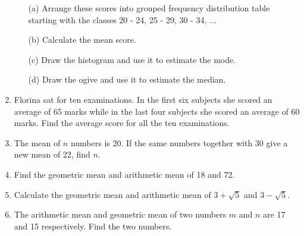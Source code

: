 \begin{enumerate}
	\begin{itemize}
	\item[(a)] Arrange these scores into grouped frequency distribution table starting with the classes 20 - 24, 25 - 29, 30 - 34, $\ldots$
	\item[(b)] Calculate the mean score.
	\item[(c)] Draw the histogram and use it to estimate the mode.
	\item[(d)] Draw the ogive and use it to estimate the median.
	\end{itemize}
	
	\item Florina sat for ten examinations. In the first six subjects she scored an average of 65 marks while in the last four subjects she scored an average of 60 marks. Find the average score for all the ten examinations.
	
	\item The mean of $n$ numbers is 20. If the same numbers together with 30 give a new mean of 22, find $n$.
	
	\item Find the geometric mean and arithmetic mean of 18 and 72.
	
	\item Calculate the geometric mean and arithmetic mean of $3 + \sqrt{5}$ and $3 - \sqrt{5}$.
	
	\item The arithmetic mean and geometric mean of two numbers $m$ and $n$ are 17 and 15 respectively. Find the two numbers.
	

\end{enumerate}	
	
	
	
